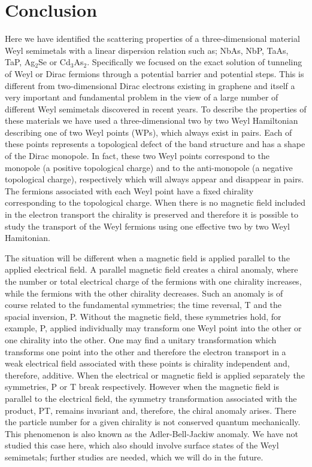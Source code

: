\documentclass[prb,twocolumn,aps,superscriptaddress,showpacs,floatfix]{revtex4}
\begin{document}

\section{Conclusion}

	Here we have identified the scattering properties of a three-dimensional material Weyl semimetals with a linear dispersion relation such as; NbAs, NbP, TaAs, TaP, Ag$_{2}$Se or Cd$_{3}$As$_{2}$. Specifically we focused on the exact solution of tunneling of Weyl or Dirac fermions through a potential barrier and potential steps. This is different from two-dimensional Dirac electrons existing in graphene and itself a very important and fundamental problem in the view of a large number of different Weyl semimetals discovered in recent years. To describe the properties of these materials we have used a three-dimensional two by two Weyl Hamiltonian describing one of two Weyl points (WPs), which always exist in pairs. Each of these points represents a topological defect of the band structure  and has a shape of the Dirac monopole. In fact, these two Weyl points correspond to the monopole (a positive topological charge) and to the anti-monopole (a negative topological charge), respectively which will always appear and disappear in pairs. The fermions associated with each Weyl point have a fixed chirality corresponding to the topological charge. When there is no magnetic field included in the electron transport the chirality is preserved and therefore it is possible to study the transport of the Weyl fermions using one effective two by two Weyl Hamitonian. 
	
	The situation will be different when a magnetic field is applied parallel to the applied electrical field. A parallel magnetic field creates a chiral anomaly, where the number or total electrical charge of the fermions with one chirality increases, while the fermions with the other chirality decreases. Such an anomaly is of course related to the fundamental symmetries; the time reversal, T and the spacial inversion, P. Without the magnetic field, these symmetries hold, for example, P,  applied individually may transform one Weyl point into the other or one chirality into the other. One may find a unitary transformation which transforms one point into the other and therefore the electron transport in a weak electrical field associated with these points is chirality independent and, therefore, additive. When the electrical or magnetic field is applied separately the symmetries,  P or T break respectively.  However when the magnetic field is parallel to the electrical field, the symmetry transformation associated with the product, PT, remains invariant and, therefore, the chiral anomaly arises\cite{anomaly-1983}. There the particle number for a given chirality is not conserved quantum mechanically. This phenomenon is also known as the Adler-Bell-Jackiw anomaly. We have not studied this case here, which also should involve surface states of the Weyl semimetals; further studies are needed, which we will do in the future.
\end{document}
